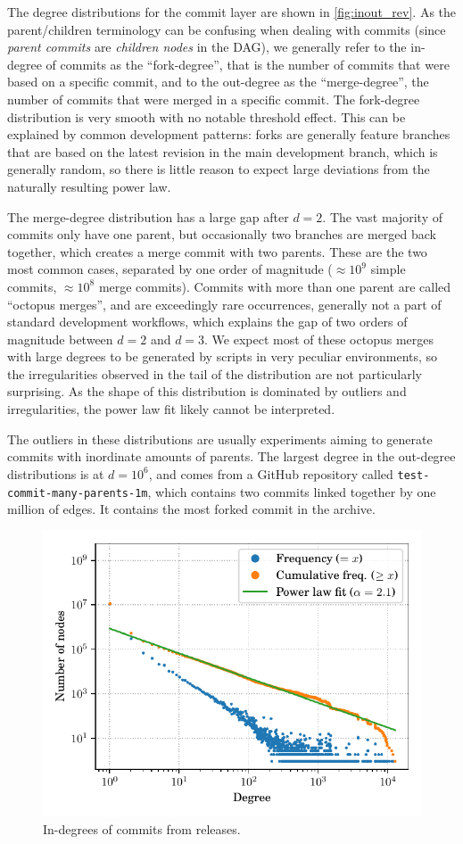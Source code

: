 The degree distributions for the commit layer are shown in
\cref{fig:inout_rev}.
As the parent/children terminology can be confusing when dealing with commits
(since \emph{parent commits} are \emph{children nodes} in the DAG), we
generally refer to the in-degree of commits as the ``fork-degree'', that is the
number of commits that were based on a specific commit, and to the out-degree as
the ``merge-degree'', the number of commits that were merged in a specific
commit.
The fork-degree distribution is very smooth with no notable threshold effect.
This can be explained by common development patterns: forks are generally
feature branches that are based on the latest revision in the main development
branch, which is generally random, so there is little reason to expect large
deviations from the naturally resulting power law.

The merge-degree distribution has a large gap after $d = 2$. The
vast majority of commits only have one parent, but occasionally two branches
are merged back together, which creates a merge commit with two parents. These
are the two most common cases, separated by one order of magnitude ($\approx
10^9$ simple commits, $\approx 10^8$ merge commits).
Commits with more than one parent are called ``octopus merges'', and are
exceedingly rare occurrences, generally not a part of standard development
workflows, which explains the gap of two orders of magnitude between $d = 2$
and $d = 3$. We expect most of these octopus merges with large degrees to be
generated by scripts in very peculiar environments, so the irregularities
observed in the tail of the distribution are not particularly surprising.
As the shape of this distribution is dominated by outliers and irregularities,
the power law fit likely cannot be interpreted.

The outliers in these distributions are usually experiments aiming to generate
commits with inordinate amounts of parents. The largest degree in the out-degree
distributions is at $d = 10^6$, and comes from a GitHub repository called
\texttt{test-commit-many-parents-1m}, which contains two commits linked
together by one million of edges. It contains the most forked commit in the
archive.


\begin{figure}
    \centering
    \includegraphics[width=.49\textwidth]{img/topology/inout/rev_in_rel}
    \caption{In-degrees of commits from releases.}%
    \label{fig:inout_rev_in_rel}
\end{figure}


